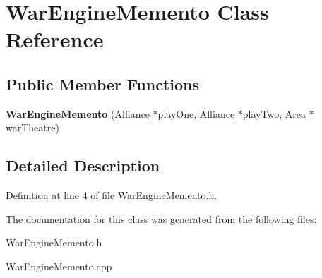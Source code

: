 \hypertarget{classWarEngineMemento}{}\section{War\+Engine\+Memento Class Reference}
\label{classWarEngineMemento}
\subsection*{Public Member Functions}
\begin{DoxyCompactItemize}
\item 
\mbox{\label{classWarEngineMemento_a7c3b61a7efa997b69024303f721d671a}} 
{\bfseries War\+Engine\+Memento} (\hyperlink{classAlliance}{Alliance} $\ast$play\+One, \hyperlink{classAlliance}{Alliance} $\ast$play\+Two, \hyperlink{classArea}{Area} $\ast$war\+Theatre)
\end{DoxyCompactItemize}


\subsection{Detailed Description}


Definition at line 4 of file War\+Engine\+Memento.\+h.



The documentation for this class was generated from the following files\+:\begin{DoxyCompactItemize}
\item 
War\+Engine\+Memento.\+h\item 
War\+Engine\+Memento.\+cpp\end{DoxyCompactItemize}
